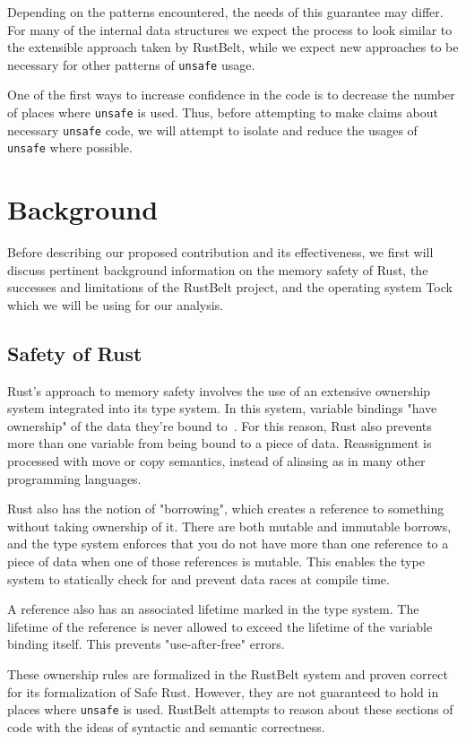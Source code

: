 \documentclass[12pt]{article}
\begin{document}
Depending on the patterns encountered, the needs of this guarantee may differ. For many of the internal data structures we expect the process to look similar to the extensible approach taken by RustBelt, while we expect new approaches to be necessary for other patterns of \texttt{unsafe} usage.

One of the first ways to increase confidence in the code is to decrease the number of places where \texttt{unsafe} is used. Thus, before attempting to make claims about necessary \texttt{unsafe} code, we will attempt to isolate and reduce the usages of \texttt{unsafe} where possible.

\section{Background}
Before describing our proposed contribution and its effectiveness, we first will discuss pertinent background information on the memory safety of Rust, the successes and limitations of the RustBelt project, and the operating system Tock~\cite{tock} which we will be using for our analysis.

\subsection{Safety of Rust}
Rust's approach to memory safety involves the use of an extensive ownership system integrated into its type system. In this system, variable bindings "have ownership" of the data they're bound to~\cite{rust_book}.
For this reason, Rust also prevents more than one variable from being bound to a piece of data. Reassignment is processed with move or copy semantics, instead of aliasing as in many other programming languages.

Rust also has the notion of "borrowing", which creates a reference to something without taking ownership of it. There are both mutable and immutable borrows, and the type system enforces that you do not have more than one reference to a piece of data when one of those references is mutable. This enables the type system to statically check for and prevent data races at compile time.

A reference also has an associated lifetime marked in the type system. The lifetime of the reference is never allowed to exceed the lifetime of the variable binding itself. This prevents "use-after-free" errors.

These ownership rules are formalized in the RustBelt system and proven correct for its formalization of Safe Rust. However, they are not guaranteed to hold in places where \texttt{unsafe} is used. RustBelt attempts to reason about these sections of code with the ideas of syntactic and semantic correctness.
\end{document}

